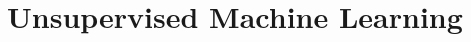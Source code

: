 \documentclass[11pt,a4paper]{report}
\begin{document}
\chapter{Unsupervised Machine Learning}


\clearpage
{}
\pagestyle{empty}
\appendix


\clearpage
{}


\end{document}
